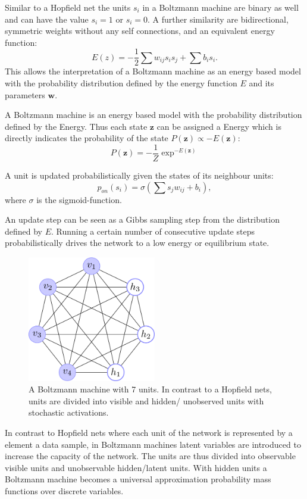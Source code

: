 Similar to a Hopfield net the units $s_i$ in a Boltzmann machine are binary as well and can have the value $s_i = 1$ or $s_i = 0$. 
A further similarity are bidirectional, symmetric weights without any self connections, and an equivalent energy function:
\[
	E(z) = - \frac{1}{2} \sum w_{ij} s_i s_j + \sum b_i s_i .
\]
This allows the interpretation of a Boltzmann machine as an energy based model with the probability distribution defined by the energy function $E$ and its parameters $\textbf{w}$.

A Boltzmann machine is an energy based model with the probability distribution defined by the Energy.
Thus each state $\textbf{z}$ can be assigned a Energy which is directly indicates the probability of the state $P(\textbf{z}) \propto -E(\textbf{z})$:
\[
P(\textbf{z}) = - \frac{1}{Z} \exp^{-E(\textbf{z})} 
\]

A unit is updated probabilistically given the states of its neighbour units:
\[
p_{on}(s_i) = \sigma( \sum s_j w_{ij} + b_i ), 
\]
where $\sigma$ is the sigmoid-function.

An update step can be seen as a Gibbs sampling step from the distribution defined by $E$.
Running a certain number of consecutive update steps probabilistically drives the network to a low energy or equilibrium state.


\begin{figure}
	\centering
    	\includegraphics[width=0.5\textwidth]{imgs/bm.png} 
    \caption{A Boltzmann machine with 7 units. In contrast to a Hopfield nets, units are divided into visible and hidden/ unobserved units with stochastic activations.}
	\label{fig:bm}
\end{figure}

In contrast to Hopfield nets where each unit of the network is represented by a element a data sample, in Boltzmann machines latent variables are introduced to increase the capacity of the network.
The units are thus divided into observable visible units and unobservable hidden/latent units.
With hidden units a Boltzmann machine becomes a universal approximation probability mass functions over discrete variables.


